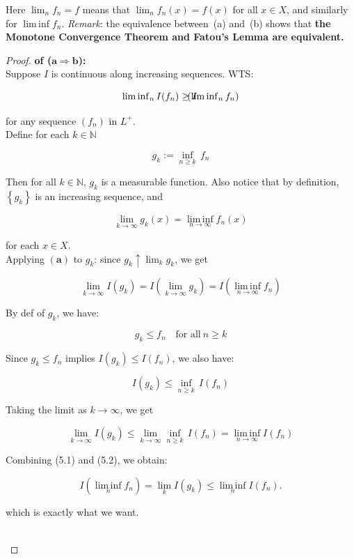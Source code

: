 Here \(\lim_{n}f_{n} = f\) means that \(\lim_{n}f_{n}(x) = f(x)\) for all \(x \in X\), and similarly for \(\operatorname{lim\, inf}f_{n}\). \emph{Remark}: the equivalence between~(a) and~(b) shows that \textbf{the Monotone Convergence Theorem and Fatou's Lemma are equivalent.}

\begin{proof}

\textbf{of (\(\mathbf{a}\Longrightarrow\mathbf{b}\)):}\\
Suppose \(I\) is continuous along increasing sequences. WTS:

\[\operatorname{lim\, inf}\limits_{n}I(f_{n}) \geq I\mspace{-18mu}(\operatorname{lim\, inf}\limits_{n}f_{n})\]

for any sequence \((f_{n})\) in \(L^{+}\).\\
Define for each \(k \in \mathbb{N}\)

\[g_{k} := \inf\limits_{n \geq k}\, f_{n}\]

Then for all \(k \in \mathbb{N}\), \(g_{k}\) is a measurable function. Also notice that by definition, \(\left\{ g_{k} \right\}\) is an increasing sequence, and

\[\lim\limits_{k\rightarrow\infty}g_{k}(x) = \operatorname{lim\, inf}\limits_{n\rightarrow\infty}f_{n}(x)\]

for each \(x \in X\).\\
Applying \((\mathbf{a})\) to \(g_{k}\): since \(g_{k} \uparrow \lim_{k}g_{k}\), we get

\[\lim\limits_{k\rightarrow\infty}I(g_{k}) = I(\lim\limits_{k\rightarrow\infty}g_{k}) = I(\operatorname{lim\, inf}\limits_{n\rightarrow\infty}f_{n})\]

By def of \(g_{k}\), we have:

\[g_{k} \leq f_{n}\quad\text{for all}\ n \geq k\]

Since \(g_{k} \leq f_{n}\) implies \(I(g_{k}) \leq I(f_{n})\), we also have:

\[I(g_{k}) \leq \inf\limits_{n \geq k}\, I(f_{n})\]

Taking the limit as \(k\rightarrow\infty\), we get

\[\lim\limits_{k\rightarrow\infty}I(g_{k}) \leq \lim\limits_{k\rightarrow\infty}\inf\limits_{n \geq k}\, I(f_{n}) = \operatorname{lim\, inf}\limits_{n\rightarrow\infty}I(f_{n})\]

Combining (5.1) and (5.2), we obtain:

\[I(\operatorname{lim\, inf}\limits_{n}f_{n}) = \lim\limits_{k}I(g_{k}) \leq \operatorname{lim\, inf}\limits_{n}I(f_{n}).\]

which is exactly what we want.\\
\strut \\

\end{proof}

